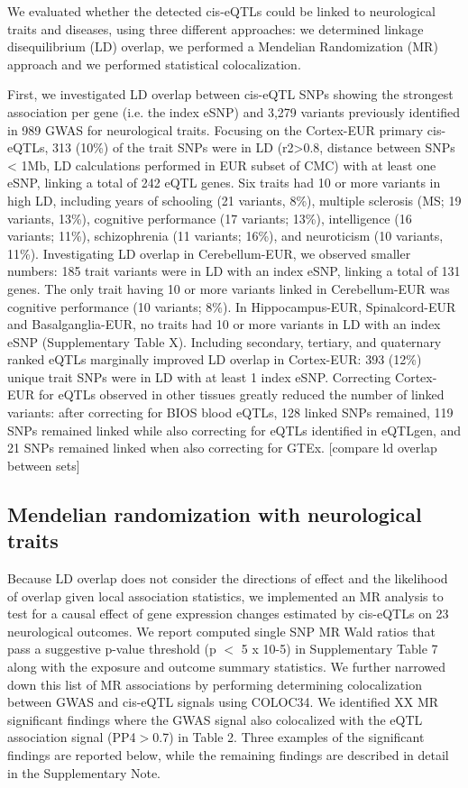 We evaluated whether the detected cis-eQTLs could be linked to neurological traits and diseases, using three different approaches: we determined linkage disequilibrium (LD) overlap, we performed a Mendelian Randomization (MR) approach and we performed statistical colocalization. 

First, we investigated LD overlap between cis-eQTL SNPs showing the strongest association per gene (i.e. the index eSNP) and 3,279 variants previously identified in 989 GWAS for neurological traits. Focusing on the Cortex-EUR primary cis-eQTLs, 313 (10\%) of the trait SNPs were in LD (r2>0.8, distance between SNPs < 1Mb, LD calculations performed in EUR subset of CMC) with at least one eSNP, linking a total of 242 eQTL genes. Six traits had 10 or more variants in high LD, including years of schooling (21 variants, 8\%), multiple sclerosis (MS; 19 variants, 13\%), cognitive performance (17 variants; 13\%), intelligence (16 variants; 11\%), schizophrenia (11 variants; 16\%), and neuroticism (10 variants, 11\%). Investigating LD overlap in Cerebellum-EUR, we observed smaller numbers: 185 trait variants were in LD with an index eSNP, linking a total of 131 genes. The only trait having 10 or more variants linked in Cerebellum-EUR was cognitive performance (10 variants; 8\%). In Hippocampus-EUR, Spinalcord-EUR and Basalganglia-EUR, no traits had 10 or more variants in LD with an index eSNP (Supplementary Table X). Including secondary, tertiary, and quaternary ranked eQTLs marginally improved LD overlap in Cortex-EUR: 393 (12\%) unique trait SNPs were in LD with at least 1 index eSNP. Correcting Cortex-EUR for eQTLs observed in other tissues greatly reduced the number of linked variants: after correcting for BIOS blood eQTLs, 128 linked SNPs remained, 119 SNPs remained linked while also correcting for eQTLs identified in eQTLgen, and 21 SNPs remained linked when also correcting for GTEx. [compare ld overlap between sets] 

\subsection{Mendelian randomization with neurological traits}
Because LD overlap does not consider the directions of effect and the likelihood of overlap given local association statistics, we implemented an MR analysis to test for a causal effect of gene expression changes estimated by cis-eQTLs on 23 neurological outcomes. We report computed single SNP MR Wald ratios that pass a suggestive p-value threshold (p $<$ 5 x 10-5) in Supplementary Table 7 along with the exposure and outcome summary statistics. We further narrowed down this list of MR associations by performing determining colocalization between GWAS and cis-eQTL signals using COLOC34. We identified XX MR significant findings where the GWAS signal also colocalized with the eQTL association signal (PP4$>$0.7) in Table 2. Three examples of the significant findings are reported below, while the remaining findings are described in detail in the Supplementary Note. 

